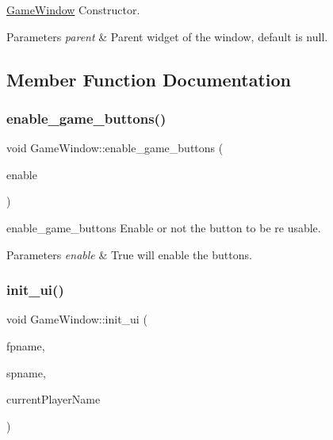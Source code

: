 \hyperlink{class_game_window}{Game\+Window} Constructor. 


\begin{DoxyParams}{Parameters}
{\em parent} & Parent widget of the window, default is null. \\
\hline
\end{DoxyParams}


\subsection{Member Function Documentation}
\mbox{\label{class_game_window_a55e1796bc70513802f85f3830140011b}} 
\subsubsection{\texorpdfstring{enable\+\_\+game\+\_\+buttons()}{enable\_game\_buttons()}}
{\footnotesize\ttfamily void Game\+Window\+::enable\+\_\+game\+\_\+buttons (\begin{DoxyParamCaption}\item[{bool}]{enable }\end{DoxyParamCaption})}



enable\+\_\+game\+\_\+buttons Enable or not the button to be re usable. 


\begin{DoxyParams}{Parameters}
{\em enable} & True will enable the buttons. \\
\hline
\end{DoxyParams}
\mbox{\label{class_game_window_a87e5f249822ac1bd895ad9bcd26a80af}} 
\subsubsection{\texorpdfstring{init\+\_\+ui()}{init\_ui()}}
{\footnotesize\ttfamily void Game\+Window\+::init\+\_\+ui (\begin{DoxyParamCaption}\item[{Q\+String}]{fpname,  }\item[{Q\+String}]{spname,  }\item[{Q\+String}]{current\+Player\+Name }\end{DoxyParamCaption})}



